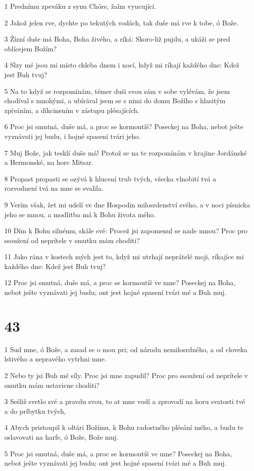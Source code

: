 \par 1 Prednímu zpeváku z synu Chóre, žalm vyucující.
\par 2 Jakož jelen rve, dychte po tekutých vodách, tak duše má rve k tobe, ó Bože.
\par 3 Žízní duše má Boha, Boha živého, a ríká: Skoro-liž pujdu, a ukáži se pred oblícejem Božím?
\par 4 Slzy mé jsou mi místo chleba dnem i nocí, když mi ríkají každého dne: Kdež jest Buh tvuj?
\par 5 Na to když se rozpomínám, témer duši svou sám v sobe vylévám, že jsem chodíval s mnohými, a ubírával jsem se s nimi do domu Božího s hlasitým zpíváním, a díkcinením v zástupu plésajících.
\par 6 Proc jsi smutná, duše má, a proc se kormoutíš? Poseckej na Boha, nebot ješte vyznávati jej budu, i hojné spasení tvári jeho.
\par 7 Muj Bože, jak tesklí duše má! Protož se na te rozpomínám v krajine Jordánské a Hermonské, na hore Mitsar.
\par 8 Propast propasti se ozývá k hlucení trub tvých, všecka vlnobití tvá a rozvodnení tvá na mne se svalila.
\par 9 Verím však, žet mi udelí ve dne Hospodin milosrdenství svého, a v noci písnicka jeho se mnou, a modlitba má k Bohu života mého.
\par 10 Dím k Bohu silnému, skále své: Procež jsi zapomenul se nade mnou? Proc pro ssoužení od neprítele v smutku mám choditi?
\par 11 Jako rána v kostech mých jest to, když mi utrhají neprátelé moji, ríkajíce mi každého dne: Kdež jest Buh tvuj?
\par 12 Proc jsi smutná, duše má, a proc se kormoutíš ve mne? Poseckej na Boha, nebot ješte vyznávati jej budu; ont jest hojné spasení tvári mé a Buh muj.

\chapter{43}

\par 1 Sud mne, ó Bože, a zasad se o mou pri; od národu nemilosrdného, a od cloveka lstivého a nepravého vytrhni mne.
\par 2 Nebo ty jsi Buh mé síly. Proc jsi mne zapudil? Proc pro ssoužení od neprítele v smutku mám ustavicne choditi?
\par 3 Sešliž svetlo své a pravdu svou, to at mne vodí a zprovodí na horu svatosti tvé a do príbytku tvých,
\par 4 Abych pristoupil k oltári Božímu, k Bohu radostného plésání mého, a budu te oslavovati na harfe, ó Bože, Bože muj.
\par 5 Proc jsi smutná, duše má, a proc se kormoutíš ve mne? Poseckej na Boha, nebot ješte vyznávati jej budu; ont jest hojné spasení tvári mé a Buh muj.


